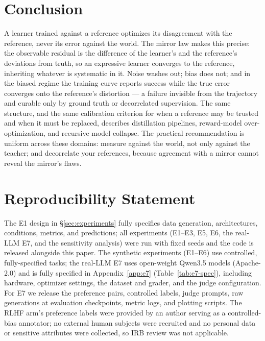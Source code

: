 \documentclass[10pt]{article} %
\theoremstyle{plain}
\theoremstyle{remark}
\begin{document}
\section{Conclusion}

A learner trained against a reference optimizes its disagreement with the reference, never its error against the world. The mirror law makes this precise: the observable residual is the difference of the learner's and the reference's deviations from truth, so an expressive learner converges to the reference, inheriting whatever is systematic in it. Noise washes out; bias does not; and in the biased regime the training curve reports success while the true error converges onto the reference's distortion --- a failure invisible from the trajectory and curable only by ground truth or decorrelated supervision. The same structure, and the same calibration criterion for when a reference may be trusted and when it must be replaced, describes distillation pipelines, reward-model over-optimization, and recursive model collapse. The practical recommendation is uniform across these domains: measure against the world, not only against the teacher; and decorrelate your references, because agreement with a mirror cannot reveal the mirror's flaws.

\section*{Reproducibility Statement}
The E1 design in \S\ref{sec:experiments} fully specifies data generation, architectures, conditions, metrics, and predictions; all experiments (E1--E3, E5, E6, the real-LLM E7, and the sensitivity analysis) were run with fixed seeds and the code is released alongside this paper. The synthetic experiments (E1--E6) use controlled, fully-specified tasks; the real-LLM E7 uses open-weight Qwen3.5 models (Apache-2.0) and is fully specified in Appendix~\ref{app:e7} (Table~\ref{tab:e7-spec}), including hardware, optimizer settings, the dataset and grader, and the judge configuration. For E7 we release the preference pairs, controlled labels, judge prompts, raw generations at evaluation checkpoints, metric logs, and plotting scripts. The RLHF arm's preference labels were provided by an author serving as a controlled-bias annotator; no external human subjects were recruited and no personal data or sensitive attributes were collected, so IRB review was not applicable.
\end{document}
